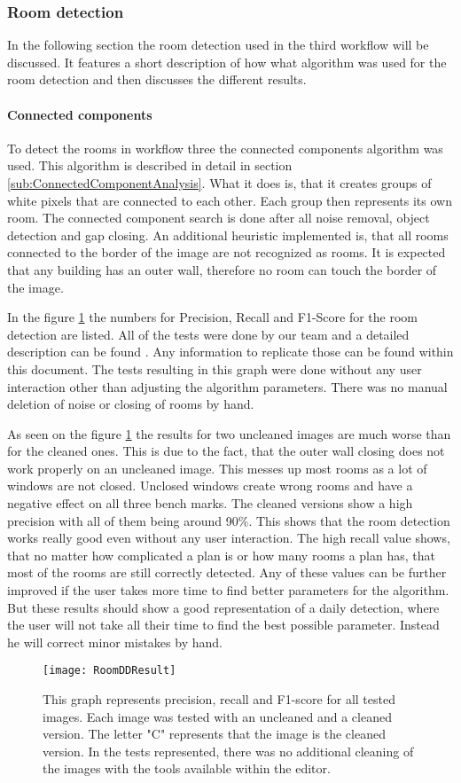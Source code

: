 \subsubsection{Room detection}
In the following section the room detection used in the third workflow will be discussed. It features a short description of how what algorithm was used for the room detection and then discusses the different results.
\paragraph{Connected components}
To detect the rooms in workflow three the connected components algorithm was used. This algorithm is described in detail in section \ref{sub:ConnectedComponentAnalysis}. What it does is, that it creates groups of white pixels that are connected to each other. Each group then represents its own room. The connected component search is done after all noise removal, object detection and gap closing. An additional heuristic implemented is, that all rooms connected to the border of the image are not recognized as rooms. It is expected that any building has an outer wall, therefore no room can touch the border of the image.

In the figure \ref{fig:RoomDDResult} the numbers for Precision, Recall and F1-Score for the room detection are listed. All of the tests were done by our team and a detailed description can be found . Any information to replicate those can be found within this document. The tests resulting in this graph were done without any user interaction other than adjusting the algorithm parameters. There was no manual deletion of noise or closing of rooms by hand.

As seen on the figure \ref{fig:RoomDDResult} the results for two uncleaned images are much worse than for the cleaned ones. This is due to the fact, that the outer wall closing does not work properly on an uncleaned image. This messes up most rooms as a lot of windows are not closed. Unclosed windows create wrong rooms and have a negative effect on all three bench marks. The cleaned versions show a high precision with all of them being around 90\%. This shows that the room detection works really good even without any user interaction. The high recall value shows, that no matter how complicated a plan is or how many rooms a plan has, that most of the rooms are still correctly detected. Any of these values can be further improved if the user takes more time to find better parameters for the algorithm. But these results should show a good representation of a daily detection, where the user will not take all their time to find the best possible parameter. Instead he will correct minor mistakes by hand.
\begin{figure}[H]
	\centering
	\texttt{[image: RoomDDResult]}
	\caption{This graph represents precision, recall and F1-score for all tested images. Each image was tested with an uncleaned and a cleaned version. The letter "C" represents that the image is the cleaned version. In the tests represented, there was no additional cleaning of the images with the tools available within the editor. }
	\label{fig:RoomDDResult}
\end{figure}

